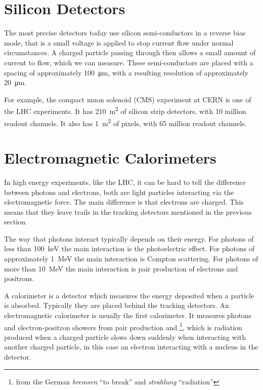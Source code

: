 \documentclass[fleqn]{NotesClass}
\begin{document}
    \section{Silicon Detectors}
    The most precise detectors today use silicon semi-conductors in a reverse bias mode, that is a small voltage is applied to stop current flow under normal circumstances.
    A charged particle passing through then allows a small amount of current to flow, which we can measure.
    These semi-conductors are placed with a spacing of approximately \qty{100}{\micro\metre}, with a resulting resolution of approximately \qty{20}{\micro\metre}.
    
    For example, the compact muon solenoid (CMS) experiment at CERN is one of the LHC experiments.
    It has \qty{210}{\metre\squared} of silicon strip detectors, with 10 million readout channels.
    It also has \qty{1}{\metre\squared} of pixels, with 65 million readout channels.
    
    \section{Electromagnetic Calorimeters}
    In high energy experiments, like the LHC, it can be hard to tell the difference between photons and electrons, both are light particles interacting via the electromagnetic force.
    The main difference is that electrons are charged.
    This means that they leave trails in the tracking detectors mentioned in the previous section.
    
    The way that photons interact typically depends on their energy.
    For photons of less than \qty{100}{\kilo\electronvolt} the main interaction is the photoelectric effect.
    For photons of approximately \qty{1}{\mega\electronvolt} the main interaction is Compton scattering.
    For photons of more than \qty{10}{\mega\electronvolt} the main interaction is pair production of electrons and positrons.
    
    A calorimeter is a detector which measures the energy deposited when a particle is absorbed.
    Typically they are placed behind the tracking detectors.
    An electromagnetic calorimeter is usually the first calorimeter.
    It measures photons and electron-positron showers from pair production and \footnote{from the German \textit{bremsen} \enquote{to break} and \textit{strahlung} \enquote{radiation}}, which is radiation produced when a charged particle slows down suddenly when interacting with another charged particle, in this case an electron interacting with a nucleus in the detector.
    
\end{document}
